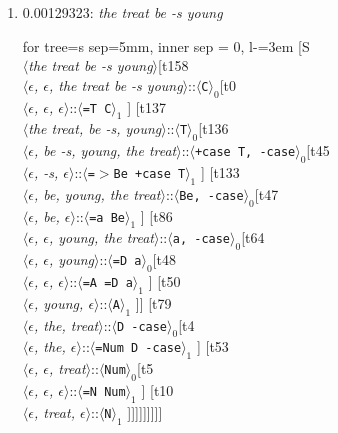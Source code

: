 \documentclass[11pt]{article}
\begin{document}
\begin{enumerate}
	\item  0.00129323: \textit{the treat be -s young} \\[0.5em]
	\begin{forest}
	for tree={s sep=5mm, inner sep = 0, l-=3em}
	[S\\$\langle$\textit{the treat be -s young}$\rangle$[t158\\$\langle$\textit{$\epsilon${,} $\epsilon${,} the treat be -s young}$\rangle$::$\langle$\texttt{C}$\rangle_0$[t0\\$\langle$\textit{$\epsilon${,} $\epsilon${,} $\epsilon$}$\rangle$::$\langle$\texttt{{=}T C}$\rangle_1$ ] [t137\\$\langle$\textit{the treat{,} be -s{,} young}$\rangle$::$\langle$\texttt{T}$\rangle_0$[t136\\$\langle$\textit{$\epsilon${,} be -s{,} young{,} the treat}$\rangle$::$\langle$\texttt{+case T{,} -case}$\rangle_0$[t45\\$\langle$\textit{$\epsilon${,} -s{,} $\epsilon$}$\rangle$::$\langle$\texttt{{=}$>$Be +case T}$\rangle_1$ ] [t133\\$\langle$\textit{$\epsilon${,} be{,} young{,} the treat}$\rangle$::$\langle$\texttt{Be{,} -case}$\rangle_0$[t47\\$\langle$\textit{$\epsilon${,} be{,} $\epsilon$}$\rangle$::$\langle$\texttt{{=}a Be}$\rangle_1$ ] [t86\\$\langle$\textit{$\epsilon${,} $\epsilon${,} young{,} the treat}$\rangle$::$\langle$\texttt{a{,} -case}$\rangle_0$[t64\\$\langle$\textit{$\epsilon${,} $\epsilon${,} young}$\rangle$::$\langle$\texttt{{=}D a}$\rangle_0$[t48\\$\langle$\textit{$\epsilon${,} $\epsilon${,} $\epsilon$}$\rangle$::$\langle$\texttt{{=}A {=}D a}$\rangle_1$ ] [t50\\$\langle$\textit{$\epsilon${,} young{,} $\epsilon$}$\rangle$::$\langle$\texttt{A}$\rangle_1$ ]] [t79\\$\langle$\textit{$\epsilon${,} the{,} treat}$\rangle$::$\langle$\texttt{D -case}$\rangle_0$[t4\\$\langle$\textit{$\epsilon${,} the{,} $\epsilon$}$\rangle$::$\langle$\texttt{{=}Num D -case}$\rangle_1$ ] [t53\\$\langle$\textit{$\epsilon${,} $\epsilon${,} treat}$\rangle$::$\langle$\texttt{Num}$\rangle_0$[t5\\$\langle$\textit{$\epsilon${,} $\epsilon${,} $\epsilon$}$\rangle$::$\langle$\texttt{{=}N Num}$\rangle_1$ ] [t10\\$\langle$\textit{$\epsilon${,} treat{,} $\epsilon$}$\rangle$::$\langle$\texttt{N}$\rangle_1$ ]]]]]]]]]
	\end{forest}
	\newpage


\end{enumerate}
\end{document}
